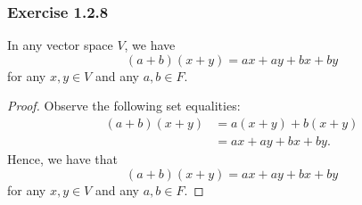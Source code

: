 \subsubsection{Exercise 1.2.8}
In any vector space \( V  \), we have 
\[  (a+b)(x+y) = ax + ay + bx + by  \] for any \( x ,y \in V  \) and any \( a,b \in F  \).
\begin{proof}
Observe the following set equalities:
\begin{align*}
    (a+b)(x+y) &= a(x+y) + b(x+y) \tag{VS 8} \\
               &= ax + ay + bx + by \tag{VS 7}.
\end{align*}
Hence, we have that 
\[  (a+b)(x+y) = ax + ay + bx + by  \] for any \( x ,y \in V  \) and any \( a,b \in F  \).
\end{proof}



